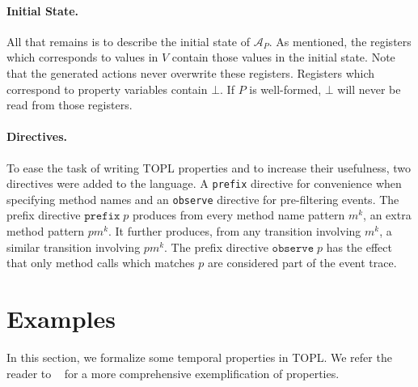 \documentclass{article} %
\newcommand{\A}{\ensuremath{\mathcal{A}}}
\theoremstyle{definition}
\theoremstyle{remark}
\begin{document}
\paragraph{Initial State.}
All that remains is to describe the initial state of $\A_P$.
As mentioned, the registers which corresponds to values in $V$
contain those values in the initial state. Note that the generated
actions never overwrite these registers. Registers which correspond
to property variables contain $\bot$. If $P$ is well-formed, $\bot$
will never be read from those registers.

\paragraph{Directives.}
To ease the task of writing TOPL properties and to increase their
usefulness, two directives were added to the language. A \texttt{prefix}
directive for convenience when specifying method names and an
\texttt{observe} directive for pre-filtering events.
%
The prefix directive $\mathtt{prefix}\; p$ produces from every
method name pattern $m^k$, an extra method pattern $pm^k$. It further
produces, from any transition involving $m^k$, a similar transition
involving $pm^k$.
%
The prefix directive $\mathtt{observe}\; p$ has the effect that only
method calls which matches $p$ are considered part of the event trace.

\section{Examples} \label{sec:examples} %

In this section, we formalize some temporal properties in TOPL. We refer the reader to ~\cite{our-fool2011} for a more comprehensive
exemplification of properties.
\end{document}
